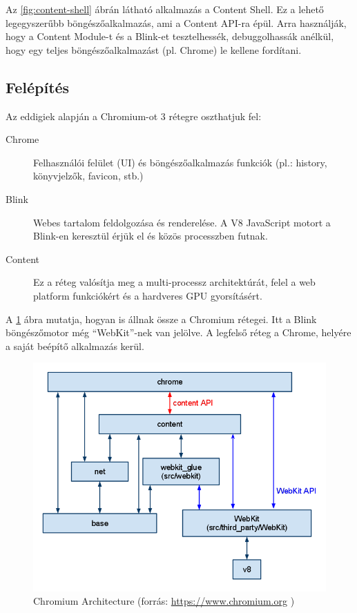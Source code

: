 \documentclass[12pt]{report}
\let\origurl\url
\renewcommand{\url}[1]{%
    \textcolor{blue}{\origurl{#1}}
}
\begin{document}
\noindent
Az \ref{fig:content-shell} ábrán látható alkalmazás a Content Shell. Ez a lehető
legegyszerűbb böngészőalkalmazás, ami a Content API-ra épül. Arra használják, hogy a
Content Module-t és a Blink-et tesztelhessék, debuggolhassák anélkül, hogy egy teljes
böngészőalkalmazást (pl. Chrome) le kellene fordítani.

\subsection{Felépítés}
Az eddigiek alapján a Chromium-ot 3 rétegre oszthatjuk fel:
\begin{description}
    \item[Chrome]
        Felhasználói felület (UI) és böngészőalkalmazás funkciók
        (pl.: history, könyvjelzők, favicon, stb.)
    \item[Blink]
        Webes tartalom feldolgozása és renderelése. A V8 JavaScript motort a
        Blink-en keresztül érjük el és közös processzben futnak.
    \item[Content]
        Ez a réteg valósítja meg a multi-processz architektúrát,
        felel a web platform funkciókért és a hardveres GPU gyorsításért.
\end{description}
A \ref{fig:chromium-architecture} ábra mutatja, hogyan is állnak össze a Chromium rétegei.
Itt a Blink böngészőmotor még ``WebKit''-nek van jelölve.
A legfelső réteg a Chrome, helyére a saját beépítő alkalmazás kerül.

\begin{figure}[h]
    \centering
    \includegraphics[scale=0.6]{chromium-architecture}
    \caption{
        \label{fig:chromium-architecture}
        Chromium Architecture
        (forrás: \url{https://www.chromium.org} \cite{bib:chromium-content-module})
    }
\end{figure}
\end{document}
